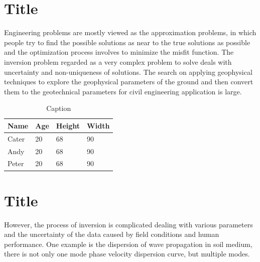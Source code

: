 \section{Title}
Engineering problems are mostly viewed as the approximation problems, in which people try to find the possible solutions as near to the true solutions as possible and the optimization process involves to minimize the misfit function. The inversion problem regarded as a very complex problem to solve deals with uncertainty and non-uniqueness of solutions. The search on applying geophysical techniques to explore the geophysical parameters of the ground and then convert them to the geotechnical parameters for civil engineering application is large. 


\begin{table}[h!]
    \centering
    \caption{Caption}
    \begin{tabu}{*{4}{X[c]}}
        \toprule
            \textbf{Name} & \textbf{Age} & \textbf{Height} & \textbf{Width} \\
        \midrule
            Cater & 20 & 68 & 90 \\
            Andy & 20 & 68 & 90 \\
            Peter & 20 & 68 & 90 \\
        \bottomrule
    \end{tabu}
    \label{tab:table}
\end{table}


\section{Title}
However, the process of inversion is complicated dealing with various parameters and the uncertainty of the data caused by field conditions and human performance. One example is the dispersion of wave propagation in soil medium, there is not only one mode phase velocity dispersion curve, but multiple modes. 

